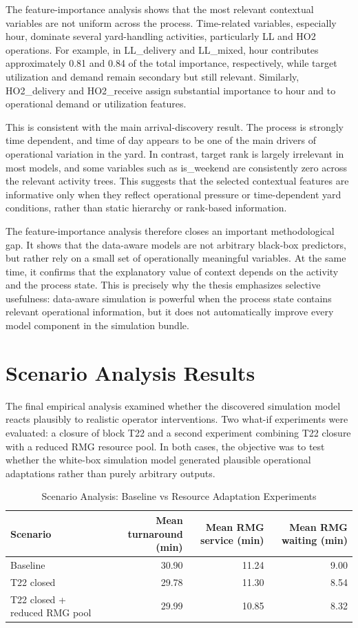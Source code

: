 The feature-importance analysis shows that the most relevant contextual variables are not uniform across the process. Time-related variables, especially hour, dominate several yard-handling activities, particularly LL and HO2 operations. For example, in LL\_delivery and LL\_mixed, hour contributes approximately 0.81 and 0.84 of the total importance, respectively, while target utilization and demand remain secondary but still relevant. Similarly, HO2\_delivery and HO2\_receive assign substantial importance to hour and to operational demand or utilization features.

This is consistent with the main arrival-discovery result. The process is strongly time dependent, and time of day appears to be one of the main drivers of operational variation in the yard. In contrast, target rank is largely irrelevant in most models, and some variables such as is\_weekend are consistently zero across the relevant activity trees. This suggests that the selected contextual features are informative only when they reflect operational pressure or time-dependent yard conditions, rather than static hierarchy or rank-based information.

The feature-importance analysis therefore closes an important methodological gap. It shows that the data-aware models are not arbitrary black-box predictors, but rather rely on a small set of operationally meaningful variables. At the same time, it confirms that the explanatory value of context depends on the activity and the process state. This is precisely why the thesis emphasizes selective usefulness: data-aware simulation is powerful when the process state contains relevant operational information, but it does not automatically improve every model component in the simulation bundle.

\section{Scenario Analysis Results}
\label{sec:scenario_analysis_results}

The final empirical analysis examined whether the discovered simulation model reacts plausibly to realistic operator interventions. Two what-if experiments were evaluated: a closure of block T22 and a second experiment combining T22 closure with a reduced RMG resource pool. In both cases, the objective was to test whether the white-box simulation model generated plausible operational adaptations rather than purely arbitrary outputs.

\begin{table}[h!]
\centering
\caption{Scenario Analysis: Baseline vs Resource Adaptation Experiments}
\label{tab:scenario_analysis}
\begin{tabular}{lrrr}
\toprule
Scenario & Mean turnaround (min) & Mean RMG service (min) & Mean RMG waiting (min) \\
\midrule
Baseline & 30.90 & 11.24 & 9.00 \\
T22 closed & 29.78 & 11.30 & 8.54 \\
T22 closed + reduced RMG pool & 29.99 & 10.85 & 8.32 \\
\bottomrule
\end{tabular}
\end{table}

